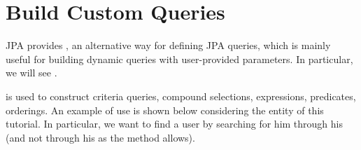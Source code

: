 \chapter{Build Custom Queries}

JPA provides , an alternative way for defining JPA
queries, which is mainly useful for building dynamic queries with user-provided
parameters. In particular, we will see .

 is used to construct criteria queries, compound
selections, expressions, predicates, orderings. An example of use is shown
below considering the  entity of this tutorial. In particular, we
want to find a user by searching for him through his  (and not
through his  as the  method allows).


